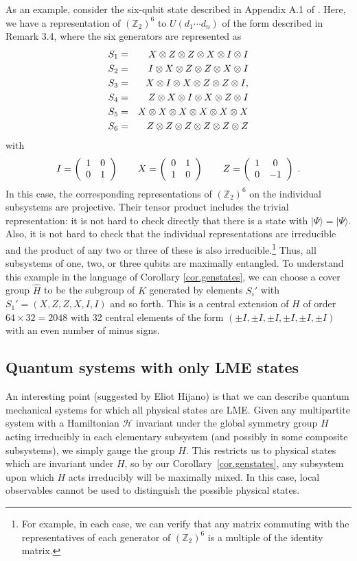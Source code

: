 \documentclass[12pt]{article}
\theoremstyle{definition}
\newcommand{\be}{\begin{equation}}
\newcommand{\ee}{\end{equation}}
\newcommand{\bea}{\begin{eqnarray}}
\newcommand{\eea}{\end{eqnarray}}
\newcommand{\ba}{\begin{array}}
\newcommand{\ea}{\end{array}}
\begin{document}
As an example, consider the six-qubit state described in Appendix A.1 of \cite{Pastawski:2015qua}. Here, we have a representation of $(\mathbb{Z}_2)^6$ to $U(d_1 \cdots d_n)$ of the form described in Remark 3.4, where the six generators are represented as
\bea
S_1 &=& X  \otimes Z  \otimes Z \otimes X \otimes I \otimes I \cr
S_2 &=& I \otimes X \otimes Z \otimes Z \otimes X \otimes I \cr
S_3 &=& X \otimes I \otimes X \otimes Z \otimes Z \otimes I, \cr
S_4 &=& Z \otimes X \otimes I \otimes X \otimes Z \otimes I \cr
S_5 &=& X \otimes X \otimes X \otimes X \otimes X \otimes X \cr
S_6 &=& Z \otimes Z \otimes Z \otimes Z \otimes Z \otimes Z 
\eea
with 
\be
I= \left(\ba{cc}1&0 \cr 0&1\ea\right) \qquad X = \left(\ba{cc}0&1 \cr 1&0\ea\right) \qquad Z = \left(\ba{cc}1&0 \cr 0&-1\ea\right) \; .
\ee
In this case, the corresponding representations of $(\mathbb{Z}_2)^6$ on the individual subsystems are projective. Their tensor product includes the trivial representation: it is not hard to check directly that there is a state with  $ |\Psi \rangle = |\Psi \rangle$. Also, it is not hard to check that the individual representations are irreducible and the product of any two or three of these is also irreducible.\footnote{For example, in each case, we can verify that any matrix commuting with the representatives of each generator of $(\mathbb{Z}_2)^6$ is a multiple of the identity matrix.} Thus, all subsystems of one, two, or three qubits are maximally entangled. To understand this example in the language of Corollary \ref{cor.genstates}, we can choose a cover group $\hat{H}$ to be the subgroup of $K$ generated by elements $S_i'$ with $S_1' = (X,Z,Z,X,I,I)$ and so forth. This is a central extension of $H$ of order $64 \times 32 = 2048$ with 32 central elements of the form $(\pm I, \pm I, \pm I, \pm I, \pm I, \pm I)$ with an even number of minus signs.

\subsection{Quantum systems with only LME states}

An interesting point (suggested by Eliot Hijano) is that we can describe quantum mechanical systems for which all physical states are LME. Given any multipartite system with a Hamiltonian ${\mathcal H}$ invariant under the global symmetry group $H$ acting irreducibly in each elementary subsystem (and possibly in some composite subsystems), we simply gauge the group $H$. This restricts us to physical states which are invariant under $H$, so by our Corollary~\ref{cor.genstates}, any subsystem upon which $H$ acts irreducibly will be maximally mixed. In this case, local observables cannot be used to distinguish the possible physical states. 
\end{document}
